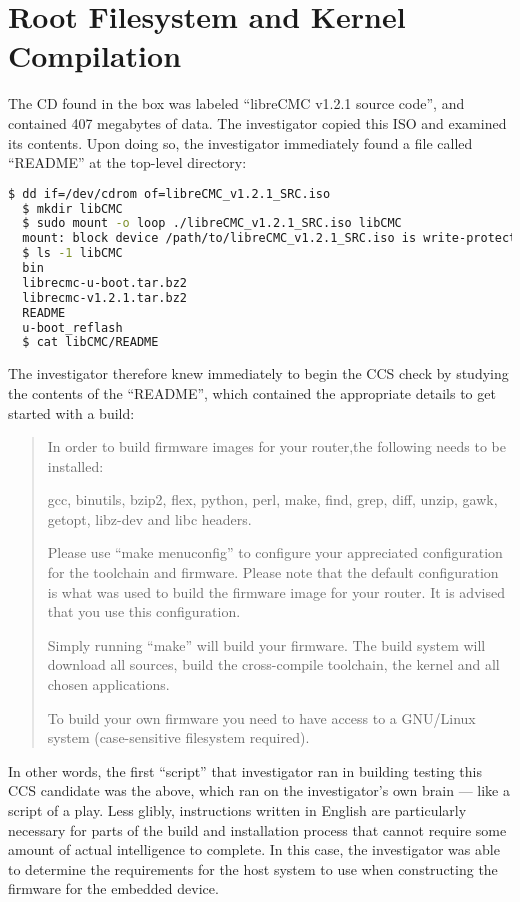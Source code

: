 \section{Root Filesystem and Kernel Compilation}

The CD found in the box was labeled ``libreCMC v1.2.1 source code'', and
contained 407 megabytes of data.  The investigator copied this ISO and
examined its contents.  Upon doing so, the investigator immediately found a
file called ``README'' at the top-level directory:

\lstset{tabsize=2}
\begin{lstlisting}[language=bash]
  $ dd if=/dev/cdrom of=libreCMC_v1.2.1_SRC.iso
  $ mkdir libCMC
  $ sudo mount -o loop ./libreCMC_v1.2.1_SRC.iso libCMC
  mount: block device /path/to/libreCMC_v1.2.1_SRC.iso is write-protected, mounting read-only
  $ ls -1 libCMC
  bin
  librecmc-u-boot.tar.bz2
  librecmc-v1.2.1.tar.bz2
  README
  u-boot_reflash
  $ cat libCMC/README
\end{lstlisting}
\label{thinkpenguin-toplevel-readme}
The investigator therefore knew immediately to begin the CCS check by
studying the contents of the ``README'', which contained the appropriate
details to get started with a build:
\begin{quotation}

In order to build firmware images for your router,the following needs to be
installed:

gcc, binutils, bzip2, flex, python, perl, make, find, grep, diff, unzip,
gawk, getopt, libz-dev and libc headers.

Please use ``make menuconfig'' to configure your appreciated configuration
for the toolchain and firmware. Please note that the default configuration is
what was used to build the firmware image for your router. It is advised that
you use this configuration.

Simply running ``make'' will build your firmware.  The build system will
download all sources, build the cross-compile toolchain, the kernel and all
chosen applications.

To build your own firmware you need to have access to a GNU/Linux system
(case-sensitive filesystem required).
\end{quotation}

In other words, the first ``script'' that investigator ran in building
testing this CCS candidate was the above, which ran on the investigator's own
brain --- like a script of a play.  Less glibly, instructions written in
English are particularly necessary for parts of the build and installation
process that cannot require some amount of actual intelligence to complete.
In this case, the investigator was able to determine the requirements for the
host system to use when constructing the firmware for the embedded device.

